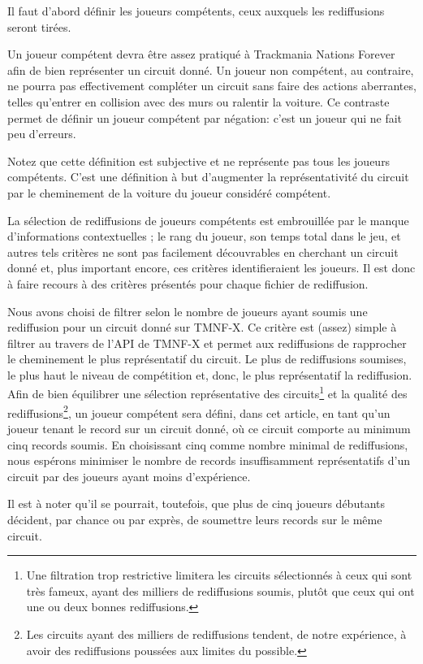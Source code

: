 \documentclass[
  oneside,
  open=any]{scrreprt}
\begin{document}
Il faut d'abord définir les joueurs compétents, ceux auxquels les
rediffusions seront tirées.

Un joueur compétent devra être assez pratiqué à Trackmania Nations
Forever afin de bien représenter un circuit donné. Un joueur non
compétent, au contraire, ne pourra pas effectivement compléter un
circuit sans faire des actions aberrantes, telles qu'entrer en collision
avec des murs ou ralentir la voiture. Ce contraste permet de définir un
joueur compétent par négation: c'est un joueur qui ne fait peu
d'erreurs.

Notez que cette définition est subjective et ne représente pas tous les
joueurs compétents. C'est une définition à but d'augmenter la
représentativité du circuit par le cheminement de la voiture du joueur
considéré compétent.

La sélection de rediffusions de joueurs compétents est embrouillée par
le manque d'informations contextuelles ; le rang du joueur, son temps
total dans le jeu, et autres tels critères ne sont pas facilement
découvrables en cherchant un circuit donné et, plus important encore,
ces critères identifieraient les joueurs. Il est donc à faire recours à
des critères présentés pour chaque fichier de rediffusion.

Nous avons choisi de filtrer selon le nombre de joueurs ayant soumis une
rediffusion pour un circuit donné sur TMNF-X. Ce critère est (assez)
simple à filtrer au travers de l'API de TMNF-X et permet aux
rediffusions de rapprocher le cheminement le plus représentatif du
circuit. Le plus de rediffusions soumises, le plus haut le niveau de
compétition et, donc, le plus représentatif la rediffusion. Afin de bien
équilibrer une sélection représentative des circuits\footnote{Une
  filtration trop restrictive limitera les circuits sélectionnés à ceux
  qui sont très fameux, ayant des milliers de rediffusions soumis,
  plutôt que ceux qui ont une ou deux bonnes rediffusions.} et la
qualité des rediffusions\footnote{Les circuits ayant des milliers de
  rediffusions tendent, de notre expérience, à avoir des rediffusions
  poussées aux limites du possible.}, un joueur compétent sera défini,
dans cet article, en tant qu'un joueur tenant le record sur un circuit
donné, où ce circuit comporte au minimum cinq records soumis. En
choisissant cinq comme nombre minimal de rediffusions, nous espérons
minimiser le nombre de records insuffisamment représentatifs d'un
circuit par des joueurs ayant moins d'expérience.

Il est à noter qu'il se pourrait, toutefois, que plus de cinq joueurs
débutants décident, par chance ou par exprès, de soumettre leurs records
sur le même circuit.
\end{document}
